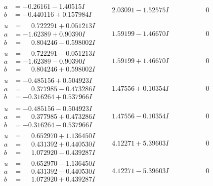 \documentclass[1p]{elsarticle_modified}
\theoremstyle{definition}
\begin{document}
$$\begin{array}{c|c|c}
\begin{aligned}
a &= -0.26161 - 1.40515 I \\
b &= -0.440116 + 0.157984 I\end{aligned}
 & \phantom{-}2.03091 - 1.52575 I & \phantom{-0.000000 } 0 \\ \hline\begin{aligned}
u &= \phantom{-}0.722291 + 0.051213 I \\
a &= -1.62389 + 0.90390 I \\
b &= \phantom{-}0.804246 - 0.598002 I\end{aligned}
 & \phantom{-}1.59199 - 1.46670 I & \phantom{-0.000000 } 0 \\ \hline\begin{aligned}
u &= \phantom{-}0.722291 - 0.051213 I \\
a &= -1.62389 - 0.90390 I \\
b &= \phantom{-}0.804246 + 0.598002 I\end{aligned}
 & \phantom{-}1.59199 + 1.46670 I & \phantom{-0.000000 } 0 \\ \hline\begin{aligned}
u &= -0.485156 + 0.504923 I \\
a &= \phantom{-}0.377985 - 0.473286 I \\
b &= -0.316264 + 0.537966 I\end{aligned}
 & \phantom{-}1.47556 + 0.10354 I & \phantom{-0.000000 } 0 \\ \hline\begin{aligned}
u &= -0.485156 - 0.504923 I \\
a &= \phantom{-}0.377985 + 0.473286 I \\
b &= -0.316264 - 0.537966 I\end{aligned}
 & \phantom{-}1.47556 - 0.10354 I & \phantom{-0.000000 } 0 \\ \hline\begin{aligned}
u &= \phantom{-}0.652970 + 1.136450 I \\
a &= \phantom{-}0.431392 + 0.440530 I \\
b &= \phantom{-}1.072920 - 0.439287 I\end{aligned}
 & \phantom{-}4.12271 + 5.39603 I & \phantom{-0.000000 } 0 \\ \hline\begin{aligned}
u &= \phantom{-}0.652970 - 1.136450 I \\
a &= \phantom{-}0.431392 - 0.440530 I \\
b &= \phantom{-}1.072920 + 0.439287 I\end{aligned}
 & \phantom{-}4.12271 - 5.39603 I & \phantom{-0.000000 } 0 \\ \hline\begin{aligned}

\end{aligned}
\end{array}$$
\end{document}
